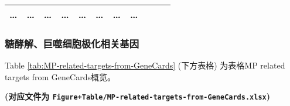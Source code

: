\documentclass[
]{article}
\begin{document}
\begin{longtable}[]{@{}lllllllllll@{}}
\begin{minipage}[t]{0.07\columnwidth}
\ldots{}\strut
\end{minipage} & \begin{minipage}[t]{0.07\columnwidth}\raggedright
\ldots{}\strut
\end{minipage} & \begin{minipage}[t]{0.07\columnwidth}\raggedright
\ldots{}\strut
\end{minipage} & \begin{minipage}[t]{0.07\columnwidth}\raggedright
\ldots{}\strut
\end{minipage} & \begin{minipage}[t]{0.07\columnwidth}\raggedright
\ldots{}\strut
\end{minipage} & \begin{minipage}[t]{0.09\columnwidth}\raggedright
\ldots{}\strut
\end{minipage} & \begin{minipage}[t]{0.10\columnwidth}\raggedright
\ldots{}\strut
\end{minipage} & \begin{minipage}[t]{0.03\columnwidth}\raggedright
\ldots{}\strut
\end{minipage}\tabularnewline
\bottomrule
\end{longtable}

\begin{center}\vspace{1.5cm}\end{center}

\hypertarget{ux7cd6ux9175ux89e3ux5de8ux566cux7ec6ux80deux6781ux5316ux76f8ux5173ux57faux56e0}{%
\subsubsection{糖酵解、巨噬细胞极化相关基因}\label{ux7cd6ux9175ux89e3ux5de8ux566cux7ec6ux80deux6781ux5316ux76f8ux5173ux57faux56e0}}

\begin{center}\vspace{1.5cm}\end{center}

Table \ref{tab:MP-related-targets-from-GeneCards} (下方表格) 为表格MP related targets from GeneCards概览。

\textbf{(对应文件为 \texttt{Figure+Table/MP-related-targets-from-GeneCards.xlsx})}
\end{document}
